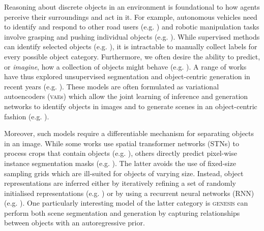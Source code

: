 \documentclass{article}
\begin{document}
Reasoning about discrete objects in an environment is foundational to how agents perceive their surroundings and act in it.
For example, autonomous vehicles need to identify and respond to other road users (e.g. \cite{geiger2012are,cordts2016Cityscapes}) and robotic manipulation tasks involve grasping and pushing individual objects (e.g. \cite{devin2018deep}).
While supervised methods can identify selected objects (e.g. \cite{ren2015faster,he2017mask}), it is intractable to manually collect labels for every possible object category.
Furthermore, we often desire the ability to predict, or \emph{imagine}, how a collection of objects might behave (e.g. \cite{wu2021greedy}).
A range of works have thus explored unsupervised segmentation and object-centric generation in recent years (e.g. \cite{huang2015efficient,eslami2016attend,xu2018multi,crawford2019spatially,yuan2019generative,lin2020space,kosiorek2018sqair,jiang2020scalor,jiang2020generative,burgess2019monet,engelcke2020genesis,engelcke2020reconstruction,greff2016tagger,greff2017neural,van2018relational,greff2019multi,veerapaneni2020entity,locatello2020object,kosiorek2019stacked,yang2020learning,bear2020learning,anciukevicius2020object,van2018case,chen2019unsupervised,bielski2019emergence,arandjelovic2019object,azadi2019compositional,nguyen2020blockgan,ehrhardt2020relate,niemeyer2020giraffe}).
These models are often formulated as variational autoencoders (\textsc{vae}s) \cite{kingma2013auto,rezende2014stochastic} which allow the joint learning of inference and generation networks to identify objects in images and to generate scenes in an object-centric fashion (e.g. \cite{engelcke2020genesis,anciukevicius2020object,jiang2020generative}).

Moreover, such models require a differentiable mechanism for separating objects in an image.
While some works use spatial transformer networks (STNs) \cite{jaderberg2015spatial} to process crops that contain objects (e.g. \cite{huang2015efficient,eslami2016attend,kosiorek2018sqair,xu2018multi,crawford2019spatially,yuan2019generative,lin2020space,jiang2020scalor,jiang2020generative}), others directly predict pixel-wise instance segmentation masks (e.g. \cite{greff2016tagger,greff2017neural,van2018relational,burgess2019monet,engelcke2020genesis,engelcke2020reconstruction,veerapaneni2020entity,greff2019multi,locatello2020object,kosiorek2019stacked,yang2020learning,bear2020learning}).
The latter avoids the use of fixed-size sampling grids which are ill-suited for objects of varying size.
Instead, object representations are inferred either by iteratively refining a set of randomly initialised representations (e.g. \cite{greff2016tagger,greff2017neural,van2018relational,greff2019multi,veerapaneni2020entity,locatello2020object}) or by using a recurrent neural networks (RNN) (e.g. \cite{burgess2019monet,engelcke2020genesis,engelcke2020reconstruction}).
One particularly interesting model of the latter category is \textsc{genesis} \cite{engelcke2020genesis} can perform both scene segmentation and generation by capturing relationships between objects with an autoregressive prior.
\end{document}
